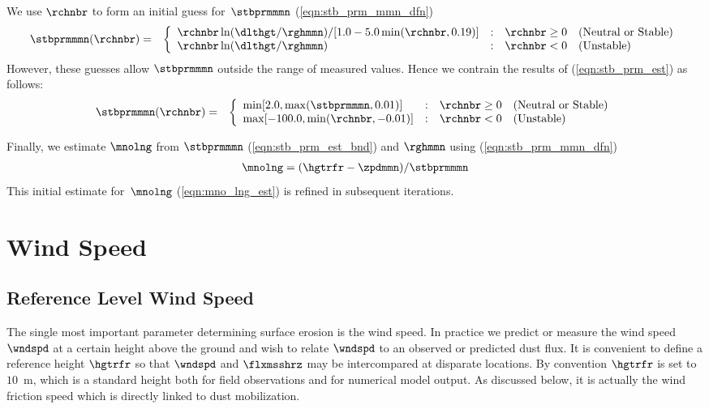 \documentclass[12pt,twoside]{book}
\begin{document}
We use $\rchnbr$ to form an initial guess for~$\stbprmmmn$
(\ref{eqn:stb_prm_mmn_dfn}) 
\begin{eqnarray}
\stbprmmmn(\rchnbr) & = & \left\{
\begin{array}{l@{\quad:\quad}l}
\rchnbr \ln(\dlthgt/\rghmmn) / [1.0-5.0\min(\rchnbr,0.19)] & \rchnbr \ge 0 
\quad \mbox{(Neutral or Stable)} \nonumber \\
\rchnbr \ln(\dlthgt/\rghmmn) & \rchnbr < 0
\quad \mbox{(Unstable)} \nonumber
\end{array} \right.
\label{eqn:stb_prm_est}
\end{eqnarray}
However, these guesses allow $\stbprmmmn$ outside the range of
measured values. 
Hence we contrain the results of (\ref{eqn:stb_prm_est}) as follows:
\begin{eqnarray}
\stbprmmmn(\rchnbr) & = & \left\{
\begin{array}{l@{\quad:\quad}l}
\min[2.0,\max(\stbprmmmn,0.01)] & \rchnbr \ge 0 
\quad \mbox{(Neutral or Stable)} \nonumber \\
\max[-100.0,\min(\rchnbr,-0.01)] & \rchnbr < 0
\quad \mbox{(Unstable)} \nonumber
\end{array} \right.
\label{eqn:stb_prm_est_bnd}
\end{eqnarray}

Finally, we estimate $\mnolng$ from $\stbprmmmn$
(\ref{eqn:stb_prm_est_bnd}) and $\rghmmn$ using
(\ref{eqn:stb_prm_mmn_dfn})  
\begin{eqnarray}
\mnolng = (\hgtrfr-\zpdmmn)/\stbprmmmn 
\label{eqn:mno_lng_est}
\end{eqnarray}
This initial estimate for~$\mnolng$ (\ref{eqn:mno_lng_est}) is refined
in subsequent iterations. 


\section[Wind Speed]{Wind Speed}

\subsection[Reference Level Wind Speed]{Reference Level Wind Speed}
The single most important parameter determining surface erosion is the
wind speed. 
In practice we predict or measure the wind speed $\wndspd$ at a
certain height above the ground and wish to relate $\wndspd$ to an
observed or predicted dust flux.
It is convenient to define a reference height $\hgtrfr$ so that
$\wndspd$ and $\flxmsshrz$ may be intercompared at disparate locations. 
By convention $\hgtrfr$ is set to $10$~m, which is a standard height
both for field observations and for numerical model output.
As discussed below, it is actually the wind friction speed which is
directly linked to dust mobilization.
\end{document}
